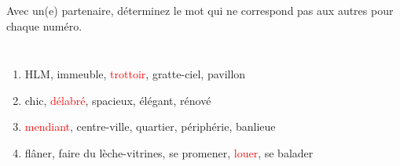 \begin{frame}{}
  Avec un(e) partenaire, déterminez le mot qui ne correspond pas aux autres pour chaque numéro.
  \begin{columns}
      \begin{enumerate}
        \item HLM, immeuble, \textcolor<2->{red}{trottoir}, gratte-ciel, pavillon
        \item chic, \textcolor<4->{red}{délabré}, spacieux, élégant, rénové
        \item \textcolor<6->{red}{mendiant}, centre-ville, quartier, périphérie, banlieue
        \item flâner, faire du lèche-vitrines, se promener, \textcolor<8->{red}{louer}, se balader
      \end{enumerate}
      \begin{minipage}[c][0.75\textheight]{\linewidth}
        \begin{center}
        \end{center}
      \end{minipage}
  \end{columns}
\end{frame}